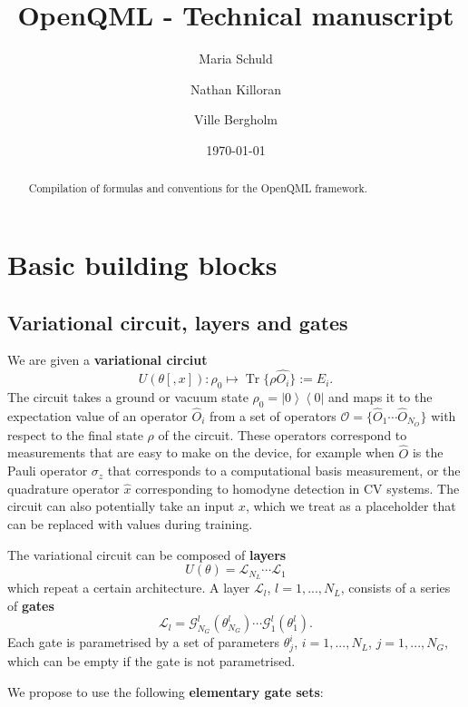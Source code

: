 \documentclass[amsmath,amssymb,aps,pra,10pt,twocolumn,groupedaddress,nofootinbib]{revtex4-1}
\DeclareMathOperator{\tr}{Tr}
\newcommand{\ket}[1]{\ensuremath{\left| #1 \right \rangle}}
\newcommand{\bra}[1]{\ensuremath{\left \langle #1 \right |}}
\newcommand{\ketbra}[2]{\ket{#1}\bra{#2}}
\newcommand{\x}{\hat{x}}
\renewcommand{\L}{\mathcal{L}}
\newcommand{\G}{\mathcal{G}}
\begin{document}
\title{OpenQML - Technical manuscript}
\author{Maria Schuld}
\author{Nathan Killoran}
\author{Ville Bergholm}


\date{\today}

\begin{abstract}
Compilation of formulas and conventions for the OpenQML framework.
\end{abstract}

\maketitle


\section{Basic building blocks}

\subsection{Variational circuit, layers and gates}

We are given a \textbf{variational circiut}
\[ U (\theta[, x]): \rho_0 \mapsto \tr \{ \rho \hat{O_i} \} := E_i. \]
The circuit takes a ground or vacuum state $\rho_0 = \ketbra{0}{0}$
and maps it to the expectation value of an operator $\hat{O}_i$ from a
set of operators $\mathcal{O} = \{\hat{O}_1 \cdots \hat{O}_{N_O}\}$
with respect to the final state $\rho$ of the circuit. These operators
correspond to measurements that are easy to make on the device, for
example when $\hat{O}$ is the Pauli operator $\sigma_z$ that
corresponds to a computational basis measurement, or the quadrature
operator $\x$ corresponding to homodyne detection in CV systems. The
circuit can also potentially take an input $x$, which we treat as a
placeholder that can be replaced with values during training.


The variational circuit can be composed of \textbf{layers}
\[ U (\theta) = \L_{N_L} \cdots \L_{1}\]
which repeat a certain architecture. A layer $\L_l$, $l=1,...,N_L$, consists of a series of \textbf{gates}
\[\L_l = \G^l_{N_G}(\theta^l_{N_G}) \cdots \G^l_1(\theta^l_1). \]
Each gate is parametrised by a set of parameters
$\theta^i_j$, $i = 1,...,N_L$, $j=1,...,N_G$,
which can be empty if the gate is not parametrised.

We propose to use the following \textbf{elementary gate sets}:
\end{document}
